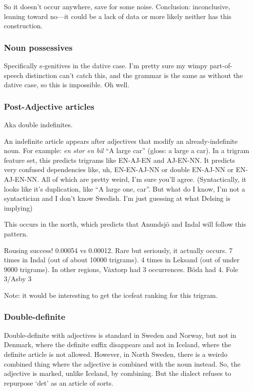 So it doesn't occur anywhere, save for some noise. Conclusion:
inconclusive, leaning toward no---it could be a lack of data or more
likely neither has this construction.

\subsubsection{Noun possessives}

Specifically s-genitives in the dative case. I'm pretty sure my wimpy
part-of-speech distinction can't catch this, and the grammar is the
same as without the dative case, so this is impossible. Oh well.

\subsubsection{Post-Adjective articles}

Aka double indefinites.

An indefinite article appears after adjectives that modify an
already-indefinite noun. For example: {\it en stor en bil} ``A large
car'' (gloss: a large a car). In a trigram feature set, this predicts
trigrams like EN-AJ-EN and AJ-EN-NN. It predicts very confused
dependencies like, uh, EN-EN-AJ-NN or double EN-AJ-NN or
EN-AJ-EN-NN. All of which are pretty weird, I'm sure you'll
agree. (Syntactically, it looks like it's duplication, like ``A large
one, car''. But what do I know, I'm not a syntactician and I don't
know Swedish. I'm just guessing at what Delsing is implying)

This occurs in the north, which predicts that Anundsj\"o and Indal
will follow this pattern.

Rousing success! 0.00054 vs 0.00012. Rare but seriously, it actually
occurs. 7 times in Indal (out of about 10000 trigrams). 4 times in
Leksand (out of under 9000 trigrams). In other regions, V\.axtorp had
3 occurrences. B\"oda had 4. Fole 3/Asby 3

Note: it would be interesting to get the icefeat ranking for this trigram.

\subsubsection{Double-definite}

Double-definite with adjectives is standard in Sweden and Norway, but
not in Denmark, where the definite suffix disappears and not in
Iceland, where the definite article is not allowed. However, in North
Sweden, there is a weirdo combined thing where the adjective is
combined with the noun instead. So, the adjective is marked, unlike
Iceland, by combining. But the dialect refuses to repurpose `det' as
an article of sorts.

